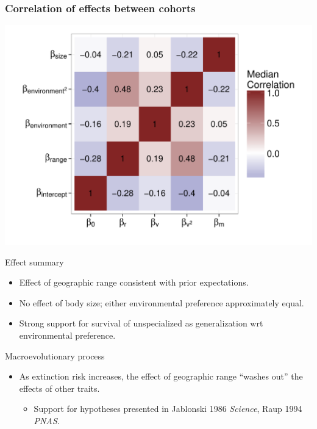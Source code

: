 \documentclass{beamer}
\begin{document}
\begin{frame}
  \frametitle{Correlation of effects between cohorts}

  \begin{center}
    \includegraphics[width = \textwidth,height = 0.9\textheight,keepaspectratio = true]{figure/wei_cor_heatmap}
  \end{center}
\end{frame}

\begin{frame}
  \begin{block}{Effect summary}
    \begin{itemize}
      \item Effect of geographic range consistent with prior expectations.
      \item No effect of body size; either environmental preference approximately equal.
      \item Strong support for survival of unspecialized as generalization wrt environmental preference.
    \end{itemize}
  \end{block}
\end{frame}

\begin{frame}
  \begin{alertblock}{Macroevolutionary process}
    \begin{itemize}
      \item As extinction risk increases, the effect of geographic range ``washes out'' the effects of other traits.
        \begin{itemize}
          \item Support for hypotheses presented in Jablonski 1986 \textit{Science}, Raup 1994 \textit{PNAS}.
        \end{itemize}
    \end{itemize}
  \end{alertblock}
\end{frame}
\end{document}
